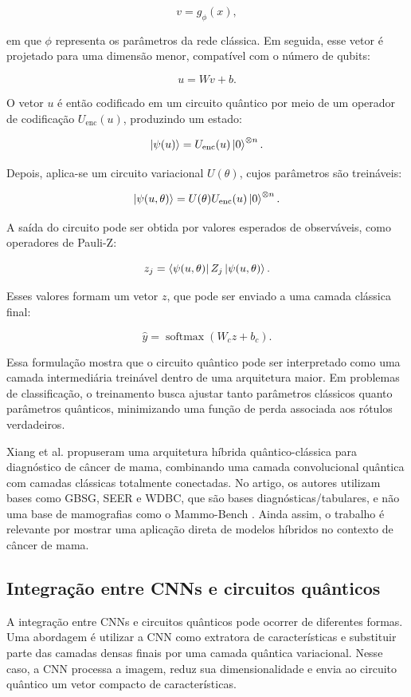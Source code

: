 \documentclass[
    12pt,
    openright,
    oneside,
    a4paper,
    english,
    brazil
]{abntex2}
\begin{document}
\[
v = g_{\phi}(x),
\]

em que \(\phi\) representa os parâmetros da rede clássica. Em seguida, esse vetor é projetado para uma dimensão menor, compatível com o número de qubits:

\[
u = Wv + b.
\]

O vetor \(u\) é então codificado em um circuito quântico por meio de um operador de codificação \(U_{\text{enc}}(u)\), produzindo um estado:

\[
\ket{\psi(u)}
=
U_{\text{enc}}(u)
\ket{0}^{\otimes n}.
\]

Depois, aplica-se um circuito variacional \(U(\theta)\), cujos parâmetros são treináveis:

\[
\ket{\psi(u,\theta)}
=
U(\theta)
U_{\text{enc}}(u)
\ket{0}^{\otimes n}.
\]

A saída do circuito pode ser obtida por valores esperados de observáveis, como operadores de Pauli-Z:

\[
z_j =
\bra{\psi(u,\theta)}
Z_j
\ket{\psi(u,\theta)}.
\]

Esses valores formam um vetor \(z\), que pode ser enviado a uma camada clássica final:

\[
\hat{y}
=
\operatorname{softmax}(W_c z + b_c).
\]

Essa formulação mostra que o circuito quântico pode ser interpretado como uma camada intermediária treinável dentro de uma arquitetura maior. Em problemas de classificação, o treinamento busca ajustar tanto parâmetros clássicos quanto parâmetros quânticos, minimizando uma função de perda associada aos rótulos verdadeiros.

Xiang et al. propuseram uma arquitetura híbrida quântico-clássica para diagnóstico de câncer de mama, combinando uma camada convolucional quântica com camadas clássicas totalmente conectadas. No artigo, os autores utilizam bases como GBSG, SEER e WDBC, que são bases diagnósticas/tabulares, e não uma base de mamografias como o Mammo-Bench \cite{xiang2024qccnn}. Ainda assim, o trabalho é relevante por mostrar uma aplicação direta de modelos híbridos no contexto de câncer de mama.

\subsection{Integração entre CNNs e circuitos quânticos}

A integração entre CNNs e circuitos quânticos pode ocorrer de diferentes formas. Uma abordagem é utilizar a CNN como extratora de características e substituir parte das camadas densas finais por uma camada quântica variacional. Nesse caso, a CNN processa a imagem, reduz sua dimensionalidade e envia ao circuito quântico um vetor compacto de características.
\end{document}
